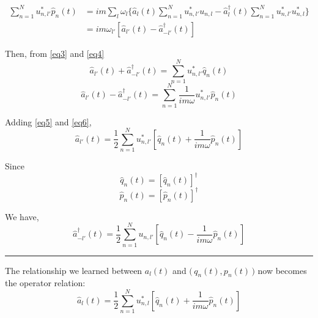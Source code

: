 \documentclass{article}
\begin{document}
\begin{align}
    \sum_{ n = 1 }^N u^*_{ n, l' } \hat{p}_n (t) &= i m \sum_l \omega_l \biggl\lbrace \hat{a}_l (t) \sum_{ n = 1 }^N u^*_{ n, l' } u_{ n, l } - \hat{a}^\dagger_l (t) \sum_{ n = 1 }^N u^*_{ n, l' } u^*_{ n, l } \biggr\rbrace \nonumber \\
    &= i m \omega_{l'} \left[ \hat{a}_{l'} (t) - \hat{a}^\dagger_{-l'} (t)  \right] \label{eq4} %
\end{align}

\noindent Then, from \eqref{eq3} and \eqref{eq4} 
\begin{equation}
    \hat{a}_{l'} (t) + \hat{a}^\dagger_{-l'} (t) = \sum_{n = 1}^N u^*_{n, l'} \hat{q}_n(t) \label{eq5} %
\end{equation} 
\begin{equation}
    \hat{a}_{l'} (t) - \hat{a}^\dagger_{-l'} (t) = \sum_{n = 1}^N \frac{1}{im\omega} u^*_{n, l'} \hat{p}_n(t) \label{eq6} %
\end{equation} 

\noindent Adding \eqref{eq5} and \eqref{eq6},
\begin{equation}
    \hat{a}_{l'} (t) = \frac{1}{2} \sum_{n = 1}^N u^*_{n, l'} \left[ \hat{q}_n(t) + \frac{1}{im\omega}  \hat{p}_n(t) \right]
\end{equation}

\noindent Since
\begin{equation*}
    \hat{q}_n (t) = [\hat{q}_n (t)]^\dagger
\end{equation*}
\begin{equation*}
        \hat{p}_n (t) = [\hat{p}_n (t)]^\dagger
\end{equation*}

\noindent We have,
\begin{equation*}
    \hat{a}^\dagger_{-l'} (t) = \frac{1}{2} \sum_{n = 1}^N u_{n, l'} \left [ \hat{q}_n(t) - \frac{1}{im\omega}  \hat{p}_n(t) \right ]
\end{equation*}

\noindent\rule{\textwidth}{.5pt}

\noindent The relationship we learned between $a_l (t)$ and $\big(\, q_n (t), p_n (t) \,\big)$ now becomes the operator relation: 
\begin{equation*}
    \hat{a}_l (t) = \frac{1}{2} \sum_{n = 1}^N u^*_{n, l} \left [ \hat{q}_n(t) + \frac{1}{im\omega}  \hat{p}_n(t) \right ]
\end{equation*}
\end{document}
